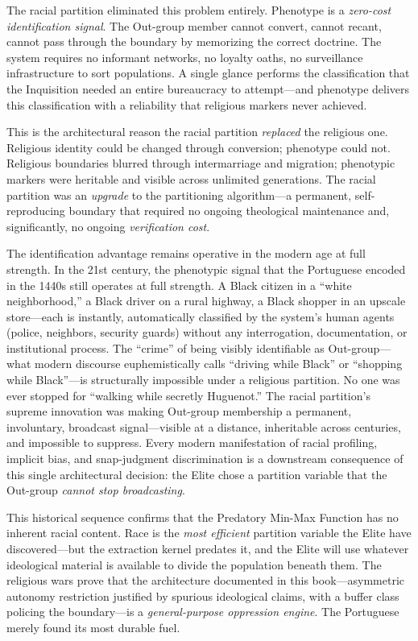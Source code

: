The racial partition eliminated this problem entirely. Phenotype is a \textit{zero-cost identification signal}. The Out-group member cannot convert, cannot recant, cannot pass through the boundary by memorizing the correct doctrine. The system requires no informant networks, no loyalty oaths, no surveillance infrastructure to sort populations. A single glance performs the classification that the Inquisition needed an entire bureaucracy to attempt---and phenotype delivers this classification with a reliability that religious markers never achieved.

This is the architectural reason the racial partition \textit{replaced} the religious one. Religious identity could be changed through conversion; phenotype could not. Religious boundaries blurred through intermarriage and migration; phenotypic markers were heritable and visible across unlimited generations. The racial partition was an \textit{upgrade} to the partitioning algorithm---a permanent, self-reproducing boundary that required no ongoing theological maintenance and, significantly, no ongoing \textit{verification cost}.

The identification advantage remains operative in the modern age at full strength. In the 21st century, the phenotypic signal that the Portuguese encoded in the 1440s still operates at full strength. A Black citizen in a ``white neighborhood,'' a Black driver on a rural highway, a Black shopper in an upscale store---each is instantly, automatically classified by the system's human agents (police, neighbors, security guards) without any interrogation, documentation, or institutional process. The ``crime'' of being visibly identifiable as Out-group---what modern discourse euphemistically calls ``driving while Black'' or ``shopping while Black''---is structurally impossible under a religious partition. No one was ever stopped for ``walking while secretly Huguenot.'' The racial partition's supreme innovation was making Out-group membership a permanent, involuntary, broadcast signal---visible at a distance, inheritable across centuries, and impossible to suppress. Every modern manifestation of racial profiling, implicit bias, and snap-judgment discrimination is a downstream consequence of this single architectural decision: the Elite chose a partition variable that the Out-group \textit{cannot stop broadcasting}.

This historical sequence confirms that the Predatory Min-Max Function has no inherent racial content. Race is the \textit{most efficient} partition variable the Elite have discovered---but the extraction kernel predates it, and the Elite will use whatever ideological material is available to divide the population beneath them. The religious wars prove that the architecture documented in this book---asymmetric autonomy restriction justified by spurious ideological claims, with a buffer class policing the boundary---is a \textit{general-purpose oppression engine}. The Portuguese merely found its most durable fuel.

